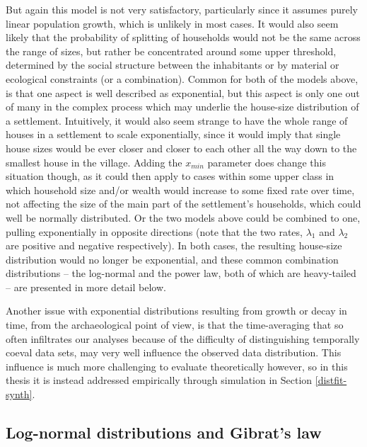 \documentclass[
  12pt,
]{book}
\begin{document}
But again this model is not very satisfactory, particularly since it assumes purely linear population growth, which is unlikely in most cases. It would also seem likely that the probability of splitting of households would not be the same across the range of sizes, but rather be concentrated around some upper threshold, determined by the social structure between the inhabitants or by material or ecological constraints (or a combination). Common for both of the models above, is that one aspect is well described as exponential, but this aspect is only one out of many in the complex process which may underlie the house-size distribution of a settlement. Intuitively, it would also seem strange to have the whole range of houses in a settlement to scale exponentially, since it would imply that single house sizes would be ever closer and closer to each other all the way down to the smallest house in the village. Adding the \(x_{min}\) parameter does change this situation though, as it could then apply to cases within some upper class in which household size and/or wealth would increase to some fixed rate over time, not affecting the size of the main part of the settlement's households, which could well be normally distributed. Or the two models above could be combined to one, pulling exponentially in opposite directions (note that the two rates, \(\lambda_1\) and \(\lambda_2\) are positive and negative respectively). In both cases, the resulting house-size distribution would no longer be exponential, and these common combination distributions -- the log-normal and the power law, both of which are heavy-tailed -- are presented in more detail below.

Another issue with exponential distributions resulting from growth or decay in time, from the archaeological point of view, is that the time-averaging that so often infiltrates our analyses because of the difficulty of distinguishing temporally coeval data sets, may very well influence the observed data distribution. This influence is much more challenging to evaluate theoretically however, so in this thesis it is instead addressed empirically through simulation in Section \ref{distfit-synth}.

\hypertarget{log-normal-distributions-and-gibrats-law}{%
\subsection{Log-normal distributions and Gibrat's law}\label{log-normal-distributions-and-gibrats-law}}
\end{document}
